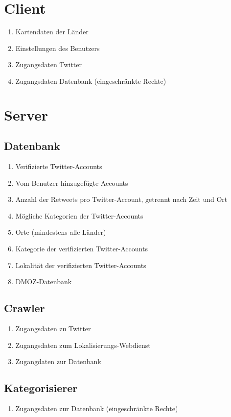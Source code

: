 \section{Client}
\begin{enumerate}[align=left,leftmargin=4em, label={\textbf{\textbackslash PD10\arabic*0\textbackslash}} ]
	\item Kartendaten der Länder 
	\item Einstellungen des Benutzers
	\item Zugangsdaten Twitter
	\item Zugangsdaten Datenbank (eingeschränkte Rechte)
\end{enumerate}	
	
\section{Server}
\subsection{Datenbank}
\begin{enumerate}[align=left,leftmargin=4em, label={\textbf{\textbackslash PD20\arabic*0\textbackslash}} ]
	\item Verifizierte Twitter-Accounts	
	\item Vom Benutzer hinzugefügte Accounts
	\item Anzahl der Retweets pro Twitter-Account, getrennt nach Zeit und Ort
	\item Mögliche Kategorien der Twitter-Accounts
	\item Orte (mindestens alle Länder)
	\item Kategorie der verifizierten Twitter-Accounts
	\item Lokalität der verifizierten Twitter-Accounts
	\item DMOZ-Datenbank
\end{enumerate}



\subsection{Crawler}
\begin{enumerate}[align=left,leftmargin=4em, label={\textbf{\textbackslash PD30\arabic*0\textbackslash}} ]
	\item Zugangsdaten zu Twitter
	\item Zugangsdaten zum Lokalisierungs-Webdienst
	\item Zugangdaten zur Datenbank
\end{enumerate}%
\subsection{Kategorisierer}
\begin{enumerate}[align=left,leftmargin=4em, label={\textbf{\textbackslash PD40\arabic*0\textbackslash}} ]
	\item Zugangsdaten zur Datenbank (eingeschränkte Rechte)
\end{enumerate}